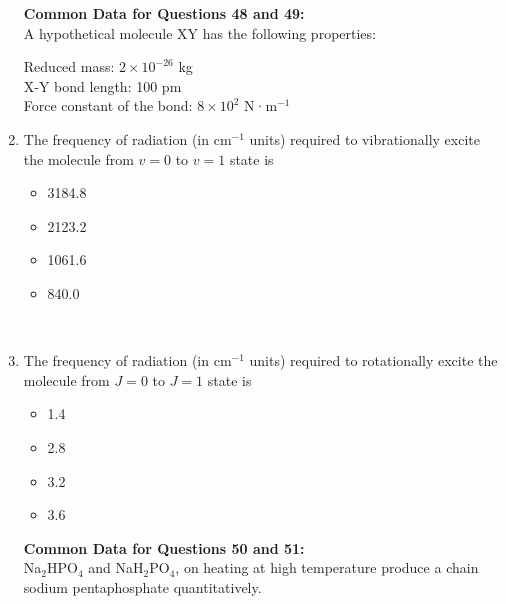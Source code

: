 \documentclass[journal,12pt,onecolumn]{IEEEtran}
\theoremstyle{remark}
\begin{document}
\begin{enumerate}
 

\noindent\textbf{Common Data for Questions 48 and 49:}\\
A hypothetical molecule XY has the following properties:

Reduced mass: \(2 \times 10^{-26}\) kg\\
X-Y bond length: 100 pm\\
Force constant of the bond: \(8 \times 10^2\) N·m\(^{-1}\)

 

\item    \hspace{0.5cm} The frequency of radiation (in cm\(^{-1}\) units) required to vibrationally excite the molecule from \(v = 0\) to \(v = 1\) state is  \hfill{}

\begin{multicols}{2}
\begin{itemize}[label=(A)]
    \item 3184.8
    \item 2123.2
    \item 1061.6
    \item 840.0
\end{itemize}
\end{multicols}

 

\newpage
\

\item    \hspace{0.5cm} The frequency of radiation (in cm\(^{-1}\) units) required to rotationally excite the molecule from \(J = 0\) to \(J = 1\) state is  \hfill{}

\begin{multicols}{2}
\begin{itemize}[label=(A)]
    \item 1.4
    \item 2.8
    \item 3.2
    \item 3.6
\end{itemize}
\end{multicols}

 

\noindent\textbf{Common Data for Questions 50 and 51:}\\
Na\(_2\)HPO\(_4\) and NaH\(_2\)PO\(_4\), on heating at high temperature produce a chain sodium pentaphosphate quantitatively.


\end{enumerate}
\end{document}
